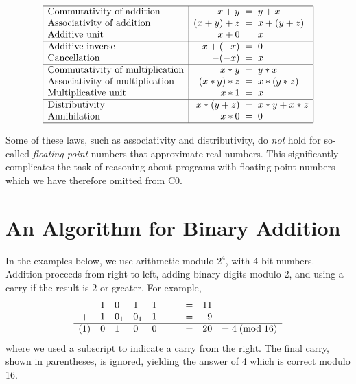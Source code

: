 $$
\begin{array}{|l|r@{\;\;=\;\;}l|}
\hline
   \text{Commutativity of addition}       & x+y     & y+x
\\ \text{Associativity of addition}       & (x+y)+z & x+(y+z)
\\ \text{Additive unit}                   & x+0     & x
\\\hline
   \text{Additive inverse}                & x+(-x)  & 0
\\ \text{Cancellation}                    & -(-x)   & x
\\\hline
   \text{Commutativity of multiplication} & x*y     & y*x
\\ \text{Associativity of multiplication} & (x*y)*z & x*(y*z)
\\ \text{Multiplicative unit}             & x*1     & x
\\\hline
   \text{Distributivity}                  & x*(y+z) & x*y + x*z
\\ \text{Annihilation}                    & x*0     & 0
\\\hline
\end{array}
$$

Some of these laws, such as associativity and distributivity, do
\emph{not} hold for so-called \emph{floating point} numbers that
approximate real numbers.  This significantly complicates the task of
reasoning about programs with floating point numbers which we have
therefore omitted from C0.

\section{An Algorithm for Binary Addition}
\label{sec:ints:binadd}

In the examples below, we use arithmetic modulo $2^4$, with 4-bit
numbers.  Addition proceeds from right to left, adding
binary digits modulo 2, and using a carry if the result
is $2$ or greater.  For example,
$$
\begin{array}{cllll@{\hspace{3em}}crl}
       & 1 & 0   & 1   & 1 & = & 11
\\   + & 1 & 0_1 & 0_1 & 1 & = &  9
\\\hline
   (1) & 0 & 1   & 0   & 0 & = & 20 & = 4\; (\mathrm{mod}\; 16)
\end{array}
$$
where we used a subscript to indicate a carry from the right.
The final carry, shown in parentheses, is ignored, yielding
the answer of 4 which is correct modulo 16.

